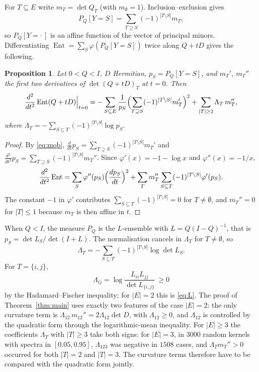 \documentclass[11pt]{amsart}
\newtheorem{proposition}[theorem]{Proposition}
\theoremstyle{remark}
\numberwithin{equation}{section}
\newcommand{\Ent}{\operatorname{Ent}}
\begin{document}
For $T\subseteq E$ write $m_T=\det Q_T$ (with $m_\emptyset=1$). Inclusion--exclusion gives
\begin{equation}\label{eq:mob}
P_Q[Y=S]=\sum_{T\supseteq S}(-1)^{|T\setminus S|}m_T ,
\end{equation}
so $P_Q[Y=\cdot\,]$ is an affine function of the vector of principal minors. Differentiating $\Ent=\sum_S\varphi(P_Q[Y=S])$ twice along $Q+tD$ gives the following.

\begin{proposition}\label{prop:second}
Let $0<Q<I$, $D$ Hermitian, $p_S=P_Q[Y=S]$, and $m_T'$, $m_T''$ the first two derivatives of $\det(Q+tD)_T$ at $t=0$. Then
\[
\frac{d^2}{dt^2}\Ent(Q+tD)\Big|_{t=0}=-\sum_{S\subseteq E}\frac{1}{p_S}\Bigl(\sum_{T\supseteq S}(-1)^{|T\setminus S|}m_T'\Bigr)^{2}+\sum_{|T|\ge2}\Lambda_T\,m_T'',
\]
where $\Lambda_T=-\sum_{S\subseteq T}(-1)^{|T\setminus S|}\log p_S$.
\end{proposition}

\begin{proof}
By \eqref{eq:mob}, $\frac{d}{dt}p_S=\sum_{T\supseteq S}(-1)^{|T\setminus S|}m_T'$ and $\frac{d^2}{dt^2}p_S=\sum_{T\supseteq S}(-1)^{|T\setminus S|}m_T''$. Since $\varphi'(x)=-1-\log x$ and $\varphi''(x)=-1/x$,
\[
\frac{d^2}{dt^2}\Ent=\sum_S\varphi''(p_S)\Bigl(\frac{dp_S}{dt}\Bigr)^2+\sum_T m_T''\sum_{S\subseteq T}(-1)^{|T\setminus S|}\varphi'(p_S).
\]
The constant $-1$ in $\varphi'$ contributes $\sum_{S\subseteq T}(-1)^{|T\setminus S|}=0$ for $T\ne\emptyset$, and $m_T''=0$ for $|T|\le1$ because $m_T$ is then affine in $t$.
\end{proof}

When $Q<I$, the measure $P_Q$ is the $L$-ensemble with $L=Q(I-Q)^{-1}$, that is $p_S=\det L_S/\det(I+L)$. The normalisation cancels in $\Lambda_T$ for $T\ne\emptyset$, so
\[
\Lambda_T=-\sum_{S\subseteq T}(-1)^{|T\setminus S|}\log\det L_S .
\]
For $T=\{i,j\}$,
\[
\Lambda_{ij}=\log\frac{L_{ii}L_{jj}}{\det L_{\{i,j\}}}\ \ge0
\]
by the Hadamard--Fischer inequality; for $|E|=2$ this is \eqref{eq:L}. The proof of Theorem~\ref{thm:main} uses exactly two features of the case $|E|=2$: the only curvature term is $\Lambda_{12}\,m_{12}''=2\Lambda_{12}\det D$, with $\Lambda_{12}\ge0$, and $\Lambda_{12}$ is controlled by the quadratic form through the logarithmic-mean inequality. For $|E|\ge3$ the coefficients $\Lambda_T$ with $|T|\ge3$ take both signs: for $|E|=3$, in $3000$ random kernels with spectra in $[0.05,0.95]$, $\Lambda_{123}$ was negative in $1508$ cases, and $\Lambda_T m_T''>0$ occurred for both $|T|=2$ and $|T|=3$. The curvature terms therefore have to be compared with the quadratic form jointly.
\end{document}

